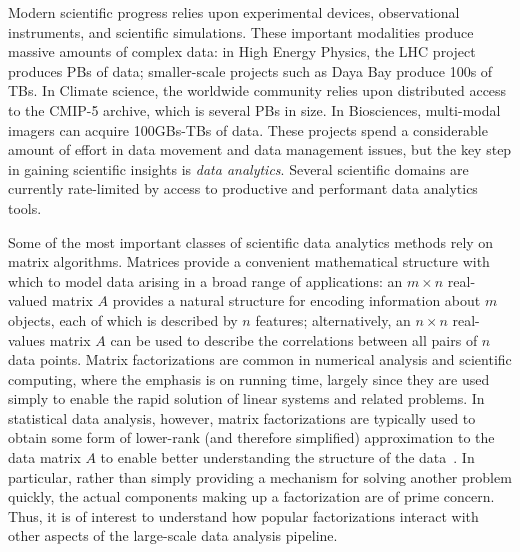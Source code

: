 Modern scientific progress relies upon experimental devices, observational instruments, and scientific simulations. These important modalities produce massive amounts of complex data: in High Energy Physics, the LHC project produces PBs of data; smaller-scale projects such as Daya Bay produce 100s of TBs. In Climate science, the worldwide community relies upon distributed access to the CMIP-5 archive, which is several PBs in size. In  Biosciences, multi-modal imagers can acquire 100GBs-TBs of data. These projects spend a considerable amount of effort in data movement and data management issues, but the key step in gaining scientific insights is \emph{data analytics}. Several scientific domains are currently rate-limited by access to productive and performant data analytics tools. 

Some of the most important classes of scientific data analytics methods rely on matrix algorithms. 
Matrices provide a convenient mathematical structure with which to model data arising in a broad range of applications: an $m \times n$ real-valued matrix $A$ provides a natural structure for encoding information about $m$ objects, each of which is described by $n$ features; alternatively, an $n \times n$ real-values matrix $A$ can be used to describe the correlations between all pairs of $n$ data points. 
Matrix factorizations are common in numerical analysis and scientific computing, where the emphasis is on running time, largely since they are used simply to enable the rapid solution of linear systems and related problems.
In statistical data analysis, however, matrix factorizations are typically used to obtain some form of lower-rank (and therefore simplified) approximation to the data matrix $A$ to enable better understanding the structure of the data~\cite{HMH00}.
In particular, rather than simply providing a mechanism for solving another problem quickly, the actual components making up a factorization are of prime concern.
Thus, it is of interest to understand how popular factorizations interact with other aspects of the large-scale data analysis pipeline.

